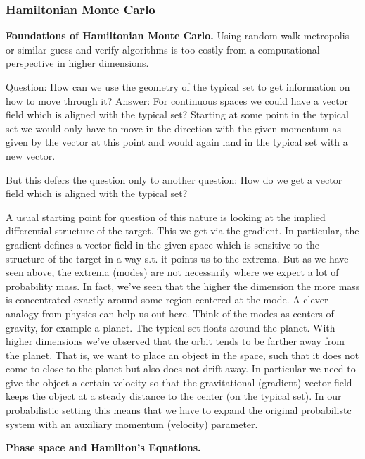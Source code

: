 \subsubsection*{Hamiltonian Monte Carlo}

\textbf{Foundations of Hamiltonian Monte Carlo.}
Using random walk metropolis or similar guess and verify algorithms is too costly
from a computational perspective in higher dimensions.

Question: How can we use the geometry of the typical set to get information
on how to move through it?
Answer: For continuous spaces we could have a vector field which is aligned with the typical set?
Starting at some point in the typical set we would only have to move in the direction with
the given momentum as given by the vector at this point and would again land in the typical set with a new vector.

But this defers the question only to another question: How do we get a vector field
which is aligned with the typical set?

A usual starting point for question of this nature is looking at the implied differential structure of the target.
This we get via the gradient. In particular, the gradient defines a vector field in the given space which is
sensitive to the structure of the target in a way s.t. it points us to the extrema.
But as we have seen above, the extrema (modes) are not necessarily where we expect
a lot of probability mass. In fact, we've seen that the higher the dimension the more
mass is concentrated exactly around some region centered at the mode.
A clever analogy from physics can help us out here. Think of the modes as centers of gravity, for example a planet.
The typical set floats around the planet. With higher dimensions we've observed that
the orbit tends to be farther away from the planet. That is, we want to place an object
in the space, such that it does not come to close to the planet but also does not drift away.
In particular we need to give the object a certain velocity so that the gravitational (gradient)
vector field keeps the object at a steady distance to the center (on the typical set).
In our probabilistic setting this means that we have to expand the original probabilistc system with
an auxiliary momentum (velocity) parameter.

\textbf{Phase space and Hamilton's Equations.}



